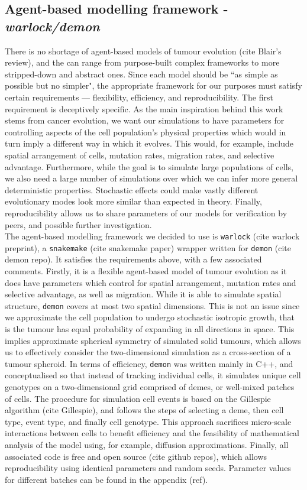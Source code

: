 \subsection{Agent-based modelling framework - \textit{warlock/demon}}
There is no shortage of agent-based models of tumour evolution (cite Blair's review), and the can range from purpose-built complex frameworks to more stripped-down and abstract ones. Since each model should be ``as simple as possible but no simpler", the appropriate framework for our purposes must satisfy certain requirements --- flexibility, efficiency, and reproducibility. The first requirement is deceptively specific. As the main inspiration behind this work stems from cancer evolution, we want our simulations to have parameters for controlling aspects of the cell population's physical properties which would in turn imply a different way in which it evolves. This would, for example, include spatial arrangement of cells, mutation rates, migration rates, and selective advantage. Furthermore, while the goal is to simulate large populations of cells, we also need a large number of simulations over which we can infer more general deterministic properties. Stochastic effects could make vastly different evolutionary modes look more similar than expected in theory. Finally, reproducibility allows us to share parameters of our models for verification by peers, and possible further investigation.\\
The agent-based modelling framework we decided to use is \texttt{warlock} (cite warlock preprint), a \texttt{snakemake} (cite snakemake paper) wrapper written for \texttt{demon} (cite demon repo). It satisfies the requirements above, with a few associated comments. Firstly, it is a flexible agent-based model of tumour evolution as it does have parameters which control for spatial arrangement, mutation rates and selective advantage, as well as migration. While it is able to simulate spatial structure, \texttt{demon} covers at most two spatial dimensions. This is not an issue since we approximate the cell population to undergo stochastic isotropic growth, that is the tumour has equal probability of expanding in all directions in space. This implies approximate spherical symmetry of simulated solid tumours, which allows us to effectively consider the two-dimensional simulation as a cross-section of a tumour spheroid. In terms of efficiency, \texttt{demon} was written mainly in C++, and conceptualised so that instead of tracking individual cells, it simulates unique cell genotypes on a two-dimensional grid comprised of demes, or well-mixed patches of cells. The procedure for simulation cell events is based on the Gillespie algorithm (cite Gillespie), and follows the steps of selecting a deme, then cell type, event type, and finally cell genotype. This approach sacrifices micro-scale interactions between cells to benefit efficiency and the feasibility of mathematical analysis of the model using, for example, diffusion approximations. Finally, all associated code is free and open source (cite github repos), which allows reproducibility using identical parameters and random seeds. Parameter values for different batches can be found in the appendix (ref).

